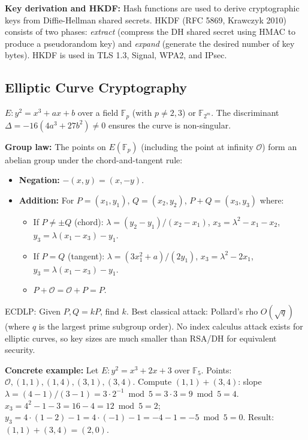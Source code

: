 \textbf{Key derivation and HKDF:} Hash functions are used to derive cryptographic keys from Diffie-Hellman shared secrets. HKDF (RFC 5869, Krawczyk 2010) consists of two phases: \emph{extract} (compress the DH shared secret using HMAC to produce a pseudorandom key) and \emph{expand} (generate the desired number of key bytes). HKDF is used in TLS 1.3, Signal, WPA2, and IPsec.

\subsection{Elliptic Curve Cryptography}
\label{sec:crypto:ecc}

$E: y^2 = x^3 + ax + b$ over a field $\mathbb{F}_p$ (with $p \neq 2,3$) or $\mathbb{F}_{2^m}$. The discriminant $\Delta = -16(4a^3 + 27b^2) \neq 0$ ensures the curve is non-singular.

\textbf{Group law:} The points on $E(\mathbb{F}_p)$ (including the point at infinity $\mathcal{O}$) form an abelian group under the chord-and-tangent rule:
\begin{itemize}
\item \textbf{Negation:} $-(x, y) = (x, -y)$.
\item \textbf{Addition:} For $P = (x_1, y_1)$, $Q = (x_2, y_2)$, $P + Q = (x_3, y_3)$ where:
  \begin{itemize}
  \item If $P \neq \pm Q$ (chord): $\lambda = (y_2 - y_1) / (x_2 - x_1)$, $x_3 = \lambda^2 - x_1 - x_2$, $y_3 = \lambda(x_1 - x_3) - y_1$.
  \item If $P = Q$ (tangent): $\lambda = (3x_1^2 + a) / (2y_1)$, $x_3 = \lambda^2 - 2x_1$, $y_3 = \lambda(x_1 - x_3) - y_1$.
  \item $P + \mathcal{O} = \mathcal{O} + P = P$.
  \end{itemize}
\end{itemize}

ECDLP: Given $P, Q = kP$, find $k$. Best classical attack: Pollard's rho $O(\sqrt{q})$ (where $q$ is the largest prime subgroup order). No index calculus attack exists for elliptic curves, so key sizes are much smaller than RSA/DH for equivalent security.

\textbf{Concrete example:} Let $E: y^2 = x^3 + 2x + 3$ over $\mathbb{F}_5$. Points: $\mathcal{O}, (1,1), (1,4), (3,1), (3,4)$. Compute $(1,1) + (3,4)$: slope $\lambda = (4 - 1) / (3 - 1) = 3 \cdot 2^{-1} \bmod 5 = 3 \cdot 3 = 9 \bmod 5 = 4$. $x_3 = 4^2 - 1 - 3 = 16 - 4 = 12 \bmod 5 = 2$; $y_3 = 4 \cdot (1 - 2) - 1 = 4 \cdot (-1) - 1 = -4 - 1 = -5 \bmod 5 = 0$. Result: $(1,1) + (3,4) = (2,0)$.

